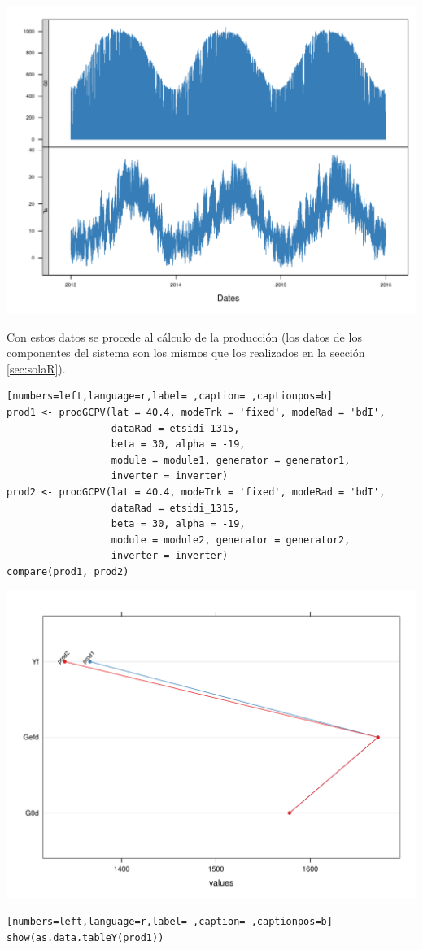\begin{center}
\includegraphics[width=\textwidth]{figuras/ejemplos3.pdf}
\end{center}
Con estos datos se procede al cálculo de la producción (los datos de los componentes del sistema son los mismos que los realizados en la sección \ref{sec:solaR}).
\begin{lstlisting}[numbers=left,language=r,label= ,caption= ,captionpos=b]
prod1 <- prodGCPV(lat = 40.4, modeTrk = 'fixed', modeRad = 'bdI',
                  dataRad = etsidi_1315,
                  beta = 30, alpha = -19, 
                  module = module1, generator = generator1,
                  inverter = inverter)
prod2 <- prodGCPV(lat = 40.4, modeTrk = 'fixed', modeRad = 'bdI',
                  dataRad = etsidi_1315,
                  beta = 30, alpha = -19, 
                  module = module2, generator = generator2,
                  inverter = inverter)
compare(prod1, prod2)
\end{lstlisting}

\begin{center}
\includegraphics[width=\textwidth]{figuras/ejemplos4.pdf}
\end{center}
\begin{lstlisting}[numbers=left,language=r,label= ,caption= ,captionpos=b]
show(as.data.tableY(prod1))
\end{lstlisting}

